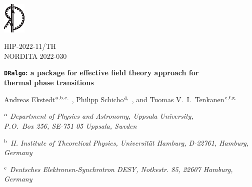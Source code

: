 \documentclass[11pt]{article}
\def\dralgo{{\tt DRalgo}}
\renewcommand{\rmi}[1]{{\mbox{\scriptsize #1}}}
\begin{document}
\flushbottom

\begin{titlepage}

\begin{minipage}{.5\textwidth}
\flushright
\includegraphics[height=1.5cm]{logo}
\end{minipage}
\begin{minipage}{.5\textwidth}
\flushright
HIP-2022-11/TH\\
NORDITA 2022-030 \\
\end{minipage}

\begin{centering}

\vfill



{\Large{\bf
\dralgo{}:
  a package for effective field theory approach for\\
  thermal phase transitions
}}

\vspace{0.8cm}

\renewcommand{\thefootnote}{\fnsymbol{footnote}}
Andreas Ekstedt$^{\rm a,b,c,}$%
\footnotemark[1],
Philipp Schicho$^{\rm d,}$%
\footnotemark[2],
and Tuomas V.~I.~Tenkanen$^{\rm e,f,g,}$%
\footnotemark[3]

\vspace{0.8cm}

$^\rmi{a}$%
{\em
Department of Physics and Astronomy, Uppsala University,\\
P.O.~Box 256, SE-751 05 Uppsala, Sweden\\}
\vspace{0.3cm}

$^\rmi{b}$%
{\em
II. Institute of Theoretical Physics, Universität Hamburg, D-22761, Hamburg, Germany\\}
\vspace{0.3cm}

$^\rmi{c}$%
{\em
Deutsches Elektronen-Synchrotron DESY, Notkestr. 85, 22607 Hamburg, Germany\\}
\vspace{0.3cm}


\end{centering}
\end{titlepage}
\end{document}
